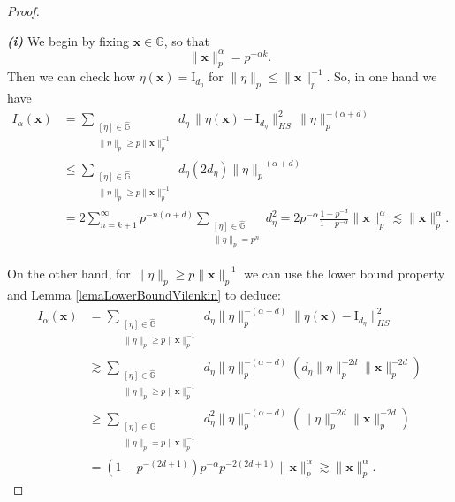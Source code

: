 \documentclass[10pt,a4paper]{amsart}
\begin{document}
 \begin{proof}
\,
 
\textit{\textbf{(i)}} We begin by fixing $\mathbf{x} \in \mathbb{G}$, so that 
\[
\|\mathbf{x}\|_{p}^\alpha = p^{-\alpha k}.
\] 
Then we can check how $\eta (\mathbf{x}) = \mathrm{I}_{d_\eta}$ for $\|\eta \|_p \leq \|\mathbf{x}\|^{-1}_p$.  
So, in one hand we have
\begin{align*}
I_\alpha(\mathbf{x}) 
&= \sum_{\substack{[\eta] \in \widehat{\mathbb{G}} \\ \|\eta\|_p \geq p \|\mathbf{x}\|^{-1}_p}}
d_\eta \, \|\eta(\mathbf{x}) - \mathrm{I}_{d_\eta} \|^2_{HS} \, \|\eta\|_p^{-(\alpha+d)} \\
&\leq \sum_{\substack{[\eta] \in \widehat{\mathbb{G}} \\ \|\eta\|_p \geq p \|\mathbf{x}\|^{-1}_p}}
d_\eta (2d_\eta ) \|\eta\|_p^{-(\alpha+d)} \\
&= 2 \sum_{n=k+1}^\infty 
p^{-n(\alpha+d)}
\sum_{\substack{[\eta] \in \widehat{\mathbb{G}} \\ \|\eta\|_p = p^n}} 
d_\eta^2 = 2 p^{-\alpha} \frac{
1 - p^{-d}}{1-p^{- \alpha}} \|\mathbf{x}\|^\alpha_p \lesssim \|\mathbf{x}\|^\alpha_p.
\end{align*}

On the other hand, for $\|\eta\|_p \geq p \|\mathbf{x}\|_p^{-1}$ we can use the lower bound property and Lemma \ref{lemaLowerBoundVilenkin} to deduce:
\begin{align*}
I_\alpha(\mathbf{x}) 
&= \sum_{\substack{[\eta] \in \widehat{\mathbb{G}} \\ \|\eta \|_p \geq p \|\mathbf{x}\|_p^{-1}}}
d_\eta \|\eta\|_p^{-(\alpha+d)} \|\eta(\mathbf{x}) - \mathrm{I}_{ d_\eta}\|_{HS}^2   \\
&\gtrsim \sum_{\substack{ [\eta] \in \widehat{\mathbb{G}} \\ \| \eta \|_p \geq p \|\mathbf{x}\|_p^{-1}}}
d_\eta \|\eta \|_p^{-(\alpha+d)} \left( d_\eta \| \eta \|_p^{-2d} \|\mathbf{x}\|_p^{-2d}  \right)  \\
&\geq \sum_{\substack{ [\eta] \in \widehat{\mathbb{G}} \\ \|\eta\|_p = p \|\mathbf{x}\|_p^{-1}}}
d_\eta^2 \|\eta\|_p^{-(\alpha+d)}  \left( \|\eta\|_p^{-2d} \|\mathbf{x}\|_p^{-2d} \right) \\
&= (1 - p^{-(2d+1)}) p^{-\alpha} p^{-2(2d+1)} \|\mathbf{x}\|^\alpha_p \gtrsim \| \mathbf{x} \|_p^\alpha.
\end{align*}

\medskip


\end{proof}
\end{document}
